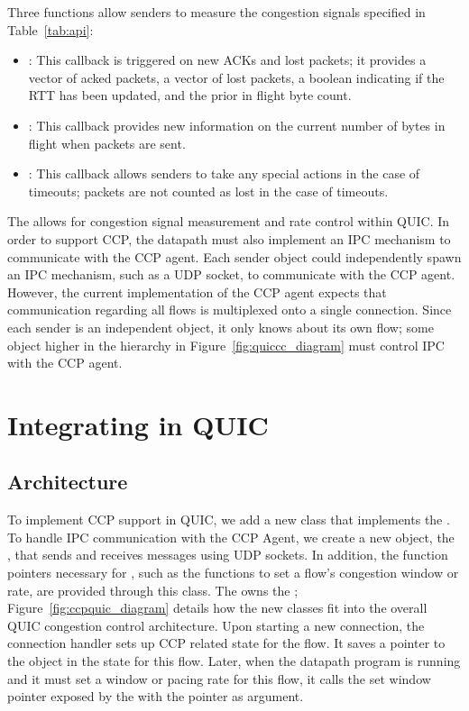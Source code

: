 Three functions allow senders to measure the congestion signals specified in Table~\ref{tab:api}:
\begin{itemize}
	\item {}: This callback is triggered on new ACKs and lost packets; it provides a vector of acked packets, a vector of lost packets, a boolean indicating if the RTT has been updated, and the prior in flight byte count.
	\item {}: This callback provides new information on the current number of bytes in flight when packets are sent.
	\item {}: This callback allows senders to take any special actions in the case of timeouts; packets are not counted as lost in the case of timeouts.
\end{itemize}

The  allows for congestion signal measurement and rate control within QUIC.
In order to support CCP, the datapath must also implement an IPC mechanism to communicate with the CCP agent.
Each sender object could independently spawn an IPC mechanism, such as a UDP socket, to communicate with the CCP agent.
However, the current implementation of the CCP agent expects that communication regarding all flows is multiplexed onto a single connection.
Since each sender is an independent object, it only knows about its own flow; some object higher in the hierarchy in Figure~\ref{fig:quiccc_diagram} must control IPC with the CCP agent.

\section{Integrating  in QUIC}
\label{sec:impl:quic_ccp}
\subsection{Architecture}

To implement CCP support in QUIC, we add a new  class that implements the .
To handle IPC communication with the CCP Agent, we create a new object, the , that sends and receives messages using UDP sockets.
In addition, the function pointers necessary for , such as the functions to set a flow's congestion window or rate, are provided through this class.
The  owns the ; Figure~\ref{fig:ccpquic_diagram} details how the new classes fit into the overall QUIC congestion control architecture.
Upon starting a new connection, the connection handler sets up CCP related state for the flow.
It saves a pointer to the  object in the  state for this flow.
Later, when the datapath program is running and it must set a window or pacing rate for this flow, it calls the set window pointer exposed by the  with the  pointer as argument.

